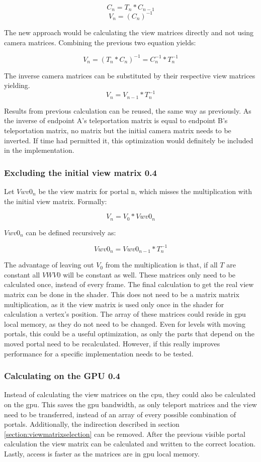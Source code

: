 $$C_n = T_{n} * C_{n-1}$$
$$V_n = (C_{n})^{-1}$$

The new approach would be calculating the view matrices directly and not using camera matrices.
Combining the previous two equation yields:

$$V_n = (T_n * C_n)^{-1} = C_n^{-1} * T_n^{-1}$$

The inverse camera matrices can be substituted by their respective view matrices yielding.
$$V_n = V_{n-1} * T_n^{-1}$$

Results from previous calculation can be reused, the same way as previously. As the inverse of \gls{endpoint} A's teleportation matrix is equal to \gls{endpoint} B's teleportation matrix, no matrix but the initial camera matrix needs to be inverted. If time had permitted it, this optimization would definitely be included in the implementation.

\subsubsection{Excluding the initial view matrix 0.4}
Let $Vwv0_n$ be the view matrix for portal n, which misses the multiplication with the initial view matrix. Formally:

$$V_n = V_0 * Vwv0_n$$

$Vwv0_n$ can be defined recursively as:

$$Vwv0_n = Vwv0_{n-1} * T_n^{-1}$$

The advantage of leaving out $V_0$ from the multiplication is that, if all $T$ are constant all $VWV0$ will be constant as well. These matrices only need to be calculated once, instead of every frame. The final calculation to get the real view matrix can be done in the shader. This does not need to be a matrix matrix multiplication, as it the view matrix is used only once in the shader for calculation a vertex's position. The array of these matrices could reside in \gls{gpu} local memory, as they do not need to be changed. Even for levels with moving portals, this could be a useful optimization, as only the parts that depend on the moved portal need to be recalculated. However, if this really improves performance for a specific implementation needs to be tested.

\subsubsection{Calculating on the GPU 0.4}
Instead of calculating the view matrices on the \gls{cpu}, they could also be calculated on the \gls{gpu}.
This saves the \gls{gpu} bandwidth, as only teleport matrices and the view need to be transferred, instead of an array of every possible combination of portals. Additionally, the indirection described in section \ref{section:viewmatrixselection} can be removed. After the previous visible portal calculation the view matrix can be calculated and written to the correct location. Lastly, access is faster as the matrices are in \gls{gpu} local memory.


